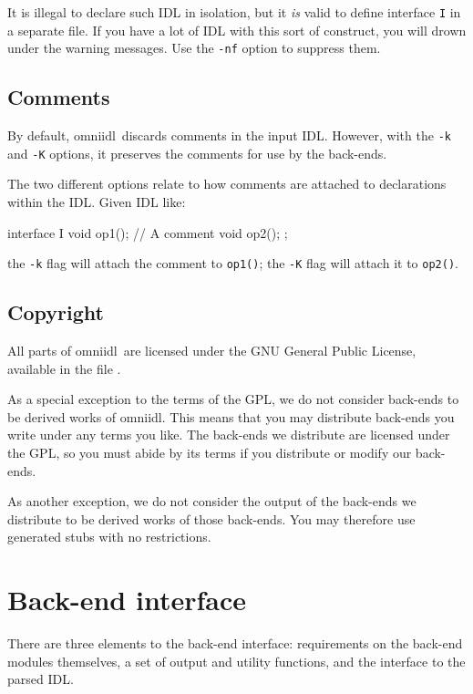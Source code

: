 \documentclass[11pt,twoside,a4paper]{article}
\newcommand{\omniidl}{\textsf{omniidl}}
\newcommand{\intf}[1]{\texttt{#1}}
\newcommand{\op}[1]{\texttt{#1()}}
\newcommand{\cmdline}[1]{\texttt{#1}}
\newcommand{\file}{\begingroup \urlstyle{tt}\Url}
\begin{document}
\noindent It is illegal to declare such IDL in isolation, but it
\emph{is} valid to define interface \intf{I} in a separate file. If
you have a lot of IDL with this sort of construct, you will drown
under the warning messages. Use the \cmdline{-nf} option to suppress
them.


\subsection{Comments}
\label{sec:comments}

By default, \omniidl\ discards comments in the input IDL. However,
with the \cmdline{-k} and \cmdline{-K} options, it preserves the
comments for use by the back-ends.

The two different options relate to how comments are attached to
declarations within the IDL. Given IDL like:

\begin{idllisting}
interface I {
  void op1();
  // A comment
  void op2();
};
\end{idllisting}

\noindent the \cmdline{-k} flag will attach the comment to \op{op1};
the \cmdline{-K} flag will attach it to \op{op2}.



\subsection{Copyright}

All parts of \omniidl\ are licensed under the GNU General Public
License, available in the file \file{COPYING}.

As a special exception to the terms of the GPL, we do not consider
back-ends to be derived works of \omniidl. This means that you may
distribute back-ends you write under any terms you like. The back-ends
we distribute are licensed under the GPL, so you must abide by its
terms if you distribute or modify our back-ends.

As another exception, we do not consider the output of the back-ends
we distribute to be derived works of those back-ends. You may
therefore use generated stubs with no restrictions.


\section{Back-end interface}
\label{sec:backend}

There are three elements to the back-end interface: requirements on
the back-end modules themselves, a set of output and utility
functions, and the interface to the parsed IDL.
\end{document}
